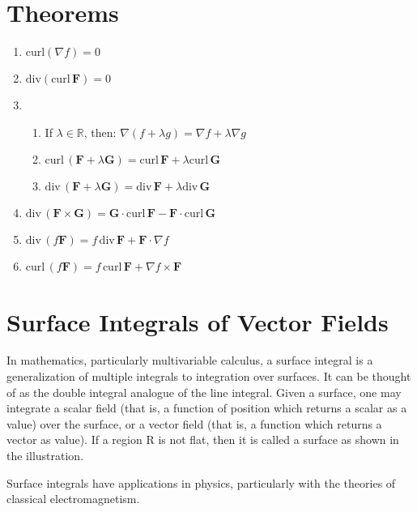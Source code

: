 \documentclass[12pt, fleqn]{book}
\newcommand{\F}{\mathbf{F}}
\newcommand{\G}{\mathbf{G}}
\newcommand{\Curl}{\mathrm{curl}}
\newcommand{\Div}{\mathrm{div}}
\begin{document}
     	\section{Theorems}
     		\begin{enumerate}
     			\item $\Curl(\nabla f) = 0$
     			\item $\Div(\Curl \, \F) = 0$
                \item \begin{enumerate}
     					\item If $\lambda \in \mathbb{R}$, then: $\nabla(f + \lambda g) = \nabla f + \lambda \nabla g$
		     			\item $\Curl \, (\F + \lambda \G) = \Curl \, \F + \lambda\Curl \, \G$
		     			\item $\Div \, (\F + \lambda \G) = \Div \, \F + \lambda\Div \, \G$
     			\end{enumerate}
     			\item $\Div \, (\F \times \G) = \G \cdot \Curl \, \F - \F \cdot \Curl \, \G$
     			\item $\Div \, (f \F) = f \, \Div \, \F + \F \cdot \nabla f$
     			\item $\Curl \, (f \F) = f \, \Curl \, \F + \nabla f \times \F$
     		\end{enumerate}
     	\section{Surface Integrals of Vector Fields}
     		
     		In mathematics, particularly multivariable calculus, a surface integral is a generalization of multiple integrals to integration over surfaces. It can be thought of as the double integral analogue of the line integral. Given a surface, one may integrate a scalar field (that is, a function of position which returns a scalar as a value) over the surface, or a vector field (that is, a function which returns a vector as value). If a region R is not flat, then it is called a surface as shown in the illustration.
     		
     		Surface integrals have applications in physics, particularly with the theories of classical electromagnetism. \\
     		
\end{document}
